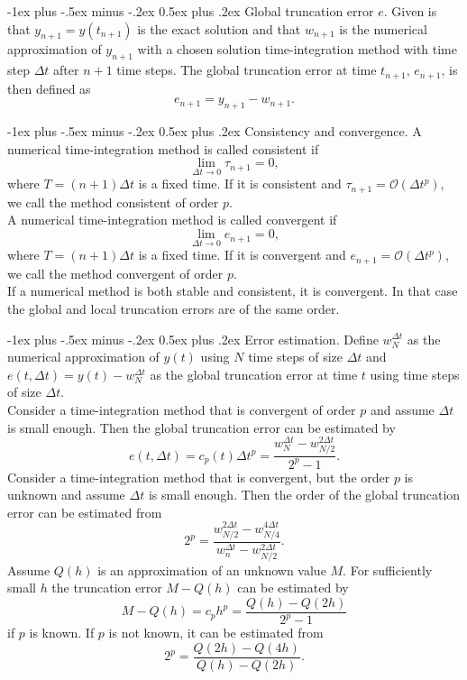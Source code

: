 \documentclass[10pt,landscape,a4paper]{article}
\makeatletter
\renewcommand{\section}{\@startsection{section}{1}{0mm}%
	{-1ex plus -.5ex minus -.2ex}%
	{0.5ex plus .2ex}%
	{\normalfont\large\bfseries}}
\makeatother
\begin{document}
\begin{multicols}{3}
	\section{Global truncation error $ e $.}
	Given is that $ y_{n+1}=y(t_{n+1}) $ is the exact solution and that $ w_{n+1} $ is the numerical approximation of $ y_{n+1} $ with a chosen solution time-integration method with time step $ \Delta t $ after $ n+1 $ time steps. The global truncation error at time $ t_{n+1} $, $ e_{n+1} $, is then defined as
	\[
		e_{n+1}=y_{n+1}-w_{n+1}.
	\]
	
	\section{Consistency and convergence.}
	A numerical time-integration method is called consistent if
	\[
		\lim_{\Delta t\rightarrow0}\tau_{n+1}=0,
	\]
	where $ T=(n+1)\Delta t $ is a fixed time. If it is consistent and $ \tau_{n+1}=\mathcal{O}(\Delta t^p) $, we call the method consistent of order $ p $.\\
	A numerical time-integration method is called convergent if
	\[
		\lim_{\Delta t\rightarrow0}e_{n+1}=0,
	\]
	where $ T=(n+1)\Delta t $ is a fixed time. If it is convergent and $ e_{n+1}=\mathcal{O}(\Delta t^p) $, we call the method convergent of order $ p $.\\
	If a numerical method is both stable and consistent, it is convergent. In that case the global and local truncation errors are of the same order.
	
	\section{Error estimation.}
	Define $ w_N^{\Delta t} $ as the numerical approximation of $ y(t) $ using $ N $ time steps of size $ \Delta t $ and $ e(t,\Delta t)=y(t)-w_N^{\Delta t} $ as the global truncation error at time $ t $ using time steps of size $ \Delta t $.\\
	Consider a time-integration method that is convergent of order $ p $ and assume $ \Delta t $ is small enough.
	Then the global truncation error can be estimated by
	\[
		e(t,\Delta t)=c_p(t)\Delta t^p=\frac{w_N^{\Delta t}-w_{N/2}^{2\Delta t}}{2^p-1}.
	\]
	Consider a time-integration method that is convergent, but the order $ p $ is unknown and assume $ \Delta t $ is small enough.
	Then the order of the global truncation error can be estimated from
	\[
		2^p=\frac{w_{N/2}^{2\Delta t}-w_{N/4}^{4\Delta t}}{w_n^{\Delta t}-w_{N/2}^{2\Delta t}}.
	\]
	Assume $ Q(h) $ is an approximation of an unknown value $ M $.
	For sufficiently small $ h $ the truncation error $ M-Q(h) $ can be estimated by
	\[
		M-Q(h)=c_ph^p=\frac{Q(h)-Q(2h)}{2^p-1}
	\]
	if $ p $ is known. If $ p $ is not known, it can be estimated from
	\[
		2^p=\frac{Q(2h)-Q(4h)}{Q(h)-Q(2h)}.
	\]
	

\end{multicols}
\end{document}
